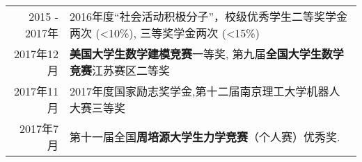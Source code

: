 %
%




\begin{tabular}{rl}	
	2015 - 2017年 & 2016年度“社会活动积极分子”，校级优秀学生二等奖学金两次 (<10\%), 三等奖学金两次 (<15\%)\\
	2017年12月 & \textbf{美国大学生数学建模竞赛}一等奖, 第九届\textbf{全国大学生数学竞赛}江苏赛区二等奖\\
	2017年11月 & 2017年度国家励志奖学金,第十二届南京理工大学机器人大赛三等奖\\%
	2017年7月 & 第十一届全国\textbf{周培源大学生力学竞赛}（个人赛）优秀奖.\\%
\end{tabular}

